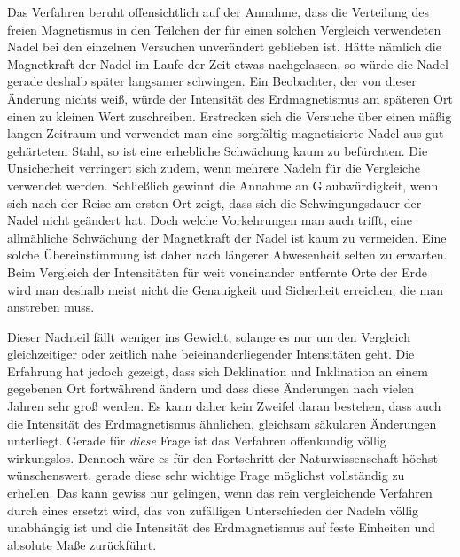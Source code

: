Das Verfahren beruht offensichtlich auf der Annahme, dass die Verteilung des freien Magnetismus in den Teilchen der für einen solchen Vergleich verwendeten Nadel bei den einzelnen Versuchen unverändert geblieben ist. Hätte nämlich die Magnetkraft der Nadel im Laufe der Zeit etwas nachgelassen, so würde die Nadel gerade deshalb später langsamer schwingen. Ein Beobachter, der von dieser Änderung nichts weiß, würde der Intensität des Erdmagnetismus am späteren Ort einen zu kleinen Wert zuschreiben. Erstrecken sich die Versuche über einen mäßig langen Zeitraum und verwendet man eine sorgfältig magnetisierte Nadel aus gut gehärtetem Stahl, so ist eine erhebliche Schwächung kaum zu befürchten. Die Unsicherheit verringert sich zudem, wenn mehrere Nadeln für die Vergleiche verwendet werden. Schließlich gewinnt die Annahme an Glaubwürdigkeit, wenn sich nach der Reise am ersten Ort zeigt, dass sich die Schwingungsdauer der Nadel nicht geändert hat. Doch welche Vorkehrungen man auch trifft, eine allmähliche Schwächung der Magnetkraft der Nadel ist kaum zu vermeiden. Eine solche Übereinstimmung ist daher nach längerer Abwesenheit selten zu erwarten. Beim Vergleich der Intensitäten für weit voneinander entfernte Orte der Erde wird man deshalb meist nicht die Genauigkeit und Sicherheit erreichen, die man anstreben muss.

Dieser Nachteil fällt weniger ins Gewicht, solange es nur um den Vergleich gleichzeitiger oder zeitlich nahe beieinanderliegender Intensitäten geht. Die Erfahrung hat jedoch gezeigt, dass sich Deklination und Inklination an einem gegebenen Ort fortwährend ändern und dass diese Änderungen nach vielen Jahren sehr groß werden. Es kann daher kein Zweifel daran bestehen, dass auch die Intensität des Erdmagnetismus ähnlichen, gleichsam säkularen Änderungen unterliegt. Gerade für \textit{diese} Frage ist das Verfahren offenkundig völlig wirkungslos. Dennoch wäre es für den Fortschritt der Naturwissenschaft höchst wünschenswert, gerade diese sehr wichtige Frage möglichst vollständig zu erhellen. Das kann gewiss nur gelingen, wenn das rein vergleichende Verfahren durch eines ersetzt wird, das von zufälligen Unterschieden der Nadeln völlig unabhängig ist und die Intensität des Erdmagnetismus auf feste Einheiten und absolute Maße zurückführt.

